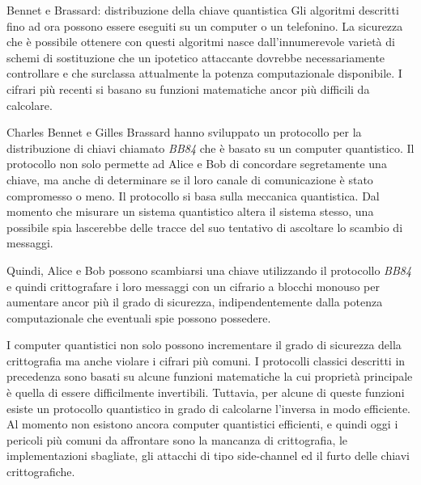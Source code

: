 \documentclass[final,hyperref={pdfpagelabels=false}]{beamer}
\begin{document}
\begin{frame}{}
\begin{columns}[t]
\begin{column}{.3\linewidth}
        \begin{block}{Bennet e Brassard: distribuzione della chiave quantistica}
          Gli algoritmi descritti fino ad ora possono essere eseguiti su un computer o un telefonino. La sicurezza che è possibile ottenere con questi algoritmi nasce dall'innumerevole varietà di schemi di sostituzione che un ipotetico attaccante dovrebbe necessariamente controllare e che surclassa attualmente la potenza computazionale disponibile. I cifrari più recenti si basano su funzioni matematiche ancor più difficili da calcolare. \par
          Charles Bennet e Gilles Brassard hanno sviluppato un protocollo per la distribuzione di chiavi chiamato {\em BB84} che è basato su un computer quantistico. Il protocollo non solo permette ad Alice e Bob di concordare segretamente una chiave, ma anche di determinare se il loro canale di comunicazione è stato compromesso o meno. Il protocollo si basa sulla meccanica quantistica. Dal momento che misurare un sistema quantistico altera il sistema stesso, una possibile spia lascerebbe delle tracce del suo tentativo di ascoltare lo scambio di messaggi. \par
          Quindi, Alice e Bob possono scambiarsi una chiave utilizzando il protocollo {\em BB84} e quindi crittografare i loro messaggi con un cifrario a blocchi monouso per aumentare ancor più il grado di sicurezza, indipendentemente dalla potenza computazionale che eventuali spie possono possedere. \par
          I computer quantistici non solo possono incrementare il grado di sicurezza della crittografia ma anche violare i cifrari più comuni.
          I protocolli classici descritti in precedenza sono basati su alcune funzioni matematiche la cui proprietà principale è quella di essere difficilmente invertibili. Tuttavia, per alcune di queste funzioni esiste un protocollo quantistico in grado di calcolarne l'inversa in modo efficiente. Al momento non esistono ancora computer quantistici efficienti, e quindi oggi i pericoli più comuni da affrontare sono la mancanza di crittografia, le implementazioni sbagliate, gli attacchi di tipo side-channel ed il furto delle chiavi crittografiche.
        \end{block}
      \end{column}
    \end{columns}
  \end{frame}
\end{document}
